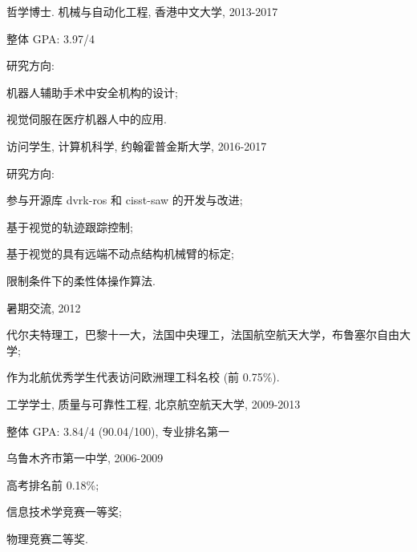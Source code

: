 \documentclass[10pt,letterpaper]{article}
\renewcommand\emph[1]{%
  {#1}
}
\renewenvironment{itemize}{
\begin{list}{}{
    \setlength{\leftmargin}{1.5em}
    \setlength{\itemsep}{0.25em}
    \setlength{\parskip}{0pt}
    \setlength{\parsep}{0.25em}
    }
    }{
\end{list}
}
\begin{document}
\begin{itemize}
    \item 哲学博士. 机械与自动化工程, 香港中文大学, 2013-2017
    \begin{itemize}
        \item \emph{整体 GPA:} 3.97/4
        \item \emph{研究方向:}
        \begin{itemize}
            \item 机器人辅助手术中安全机构的设计;
            \item 视觉伺服在医疗机器人中的应用.
        \end{itemize}
    \end{itemize}
    \item 访问学生, 计算机科学, 约翰霍普金斯大学, 2016-2017
    \begin{itemize}
        \item \emph{研究方向:}
        \begin{itemize}
            \item 参与开源库 dvrk-ros 和 cisst-saw 的开发与改进;
            \item 基于视觉的轨迹跟踪控制;
            \item 基于视觉的具有远端不动点结构机械臂的标定;
            \item 限制条件下的柔性体操作算法.
        \end{itemize}
    \end{itemize}
    \item 暑期交流, 2012
    \begin{itemize}
        \item 代尔夫特理工，巴黎十一大，法国中央理工，法国航空航天大学，布鲁塞尔自由大学;
        \item 作为北航优秀学生代表访问欧洲理工科名校 (前 0.75\%).
    \end{itemize}
    \item 工学学士, 质量与可靠性工程, 北京航空航天大学, 2009-2013
    \begin{itemize}
        \item \emph{整体 GPA:} 3.84/4 (90.04/100), 专业排名第一
    \end{itemize}
    \item 乌鲁木齐市第一中学, 2006-2009
    \begin{itemize}
        \item 高考排名前 0.18\%;
        \item 信息技术学竞赛一等奖;
        \item 物理竞赛二等奖.
    \end{itemize}
\end{itemize}
\end{document}
